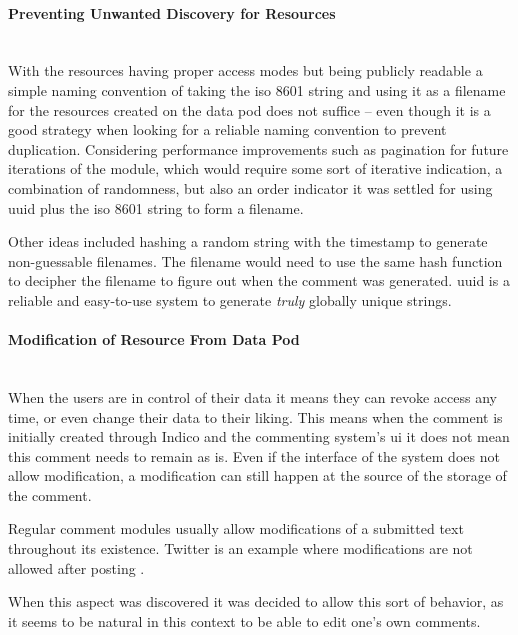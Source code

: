 \paragraph{Preventing Unwanted Discovery for Resources}\mbox{}\\

With the resources having proper access modes but being publicly readable a simple naming convention of taking the \gls{iso} 8601 string and using it as a filename for the resources created on the data pod does not suffice -- even though it is a good strategy when looking for a reliable naming convention to prevent duplication. Considering performance improvements such as pagination for future iterations of the module, which would require some sort of iterative indication, a combination of randomness, but also an order indicator it was settled for using \gls{uuid} plus the \gls{iso} 8601 string to form a filename.

Other ideas included hashing a random string with the timestamp to generate non-guessable filenames. The filename would need to use the same hash function to decipher the filename to figure out when the comment was generated. \gls{uuid} is a reliable and easy-to-use system to generate \textit{truly} globally unique strings. 
\vspace{0.5cm}
\paragraph{Modification of Resource From Data Pod}\mbox{}\\

When the users are in control of their data it means they can revoke access any time, or even change their data to their liking. This means when the comment is initially created through Indico and the commenting system's \gls{ui} it does not mean this comment needs to remain as is. Even if the interface of the system does not allow modification, a modification can still happen at the source of the storage of the comment.

Regular comment modules usually allow modifications of a submitted text throughout its existence. Twitter is an example where modifications are not allowed after posting \cite{twitter-edit}. 

When this aspect was discovered it was decided to allow this sort of behavior, as it seems to be natural in this context to be able to edit one's own comments.

\vspace{0.5cm}
